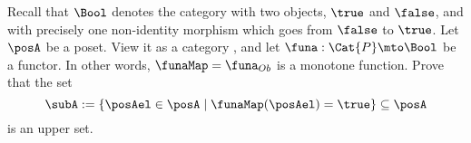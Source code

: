 \begin{gradedexercise}\label{ex:UpperSetsViaFunctors}
Recall that $\Bool$ denotes the category with two objects, $\true$ and $\false$, and with precisely one non-identity morphism which goes from $\false$ to $\true$. Let $\posA$ be a poset. View it as a category , and let $\funa : \Cat{P} \mto \Bool$ be a functor. In other words, $\funaMap = \funa_{Ob}$ is a monotone function. Prove that the set 
\begin{equation}
\subA := \{ \posAel \in \posA \mid \funaMap(\posAel) = \true \} \subseteq \posA
\end{equation}
is an upper set. 
\end{gradedexercise}

%
%
%
%
%
